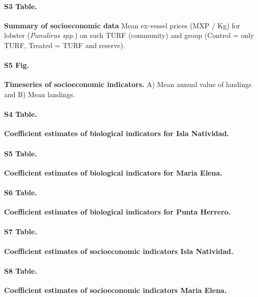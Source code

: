 \documentclass[10pt]{article}
\begin{document}
\paragraph*{S3 Table.}

\label{S3_Table}
{\bf Summary of socioeconomic data} Mean ex-vessel prices (MXP / Kg) for lobster (\emph{Panulirus spp.}) on each TURF (community) and group (Control = only TURF, Treated = TURF and reserve).

\paragraph*{S5 Fig.}
\label{S5_Fig}
{\bf Timeseries of socioeconomic indicators.} A) Mean annual value of landings and B) Mean landings.

\paragraph*{S4 Table.}

\label{S4_Table}
{\bf Coefficient estimates of biological indicators for Isla Natividad.}

\paragraph*{S5 Table.}

\label{S5_Table}
{\bf Coefficient estimates of biological indicators for Maria Elena.}

\paragraph*{S6 Table.}

\label{S6_Table}
{\bf Coefficient estimates of biological indicators for Punta Herrero.}

\paragraph*{S7 Table.}

\label{S7_Table}
{\bf Coefficient estimates of socioeconomic indicators Isla Natividad.}

\paragraph*{S8 Table.}

\label{S8_Table}
{\bf Coefficient estimates of socioeconomic indicators Maria Elena.}

\nolinenumbers

%
\end{document}
